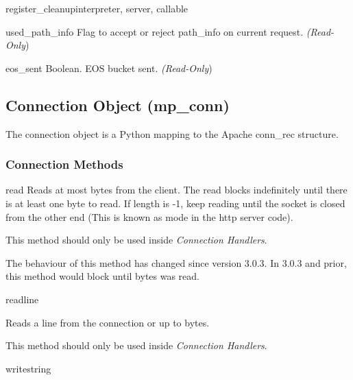 \begin{funcdesc}{register_cleanup}{interpreter, server, callable}
\begin{memberdesc}[request]{used_path_info}
  Flag to accept or reject path_info on current request.
  \emph{(Read-Only})
\end{memberdesc}

\begin{memberdesc}[request]{eos_sent}
  Boolean. EOS bucket sent.
  \emph{(Read-Only})
\end{memberdesc}

\subsection{Connection Object (mp_conn)\label{pyapi-mpconn}}

The connection object is a Python mapping to the Apache conn_rec
structure.

\subsubsection{Connection Methods\label{pyapi-mpconn-meth}}

\begin{methoddesc}[connection]{read}{}
  Reads at most  bytes from the client. The read blocks
  indefinitely until there is at least one byte to read. If length is
  -1, keep reading until the socket is closed from the other end (This
  is known as  mode in the http server code).

  This method should only be used inside \emph{Connection Handlers}.

  \begin{notice}
    The behaviour of this method has changed since version 3.0.3. In
    3.0.3 and prior, this method would block until  bytes
    was read.
  \end{notice}

\end{methoddesc}

\begin{methoddesc}[connection]{readline}{}

  Reads a line from the connection or up to  bytes.

  This method should only be used inside \emph{Connection Handlers}.

\end{methoddesc}

\begin{methoddesc}[connection]{write}{string}


\end{methoddesc}
\end{funcdesc}
